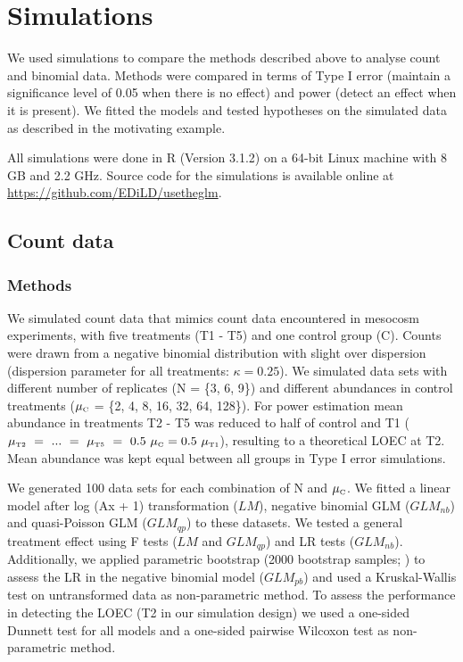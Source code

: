 \documentclass{scrartcl}
\begin{document}
\newpage
\section{Simulations}
We used simulations to compare the methods described above to analyse count and binomial data.
Methods were compared in terms of Type I error (maintain a significance level of 0.05 when there is no effect) and power (detect an effect when it is present). 
We fitted the models and tested hypotheses on the simulated data as described in the motivating example.

All simulations were done in R (Version 3.1.2) \citep{r_core_team_r:_2014} on a 64-bit Linux machine with 8 GB and 2.2 GHz.
Source code for the simulations is available online at \url{https://github.com/EDiLD/usetheglm}.

\subsection{Count data}
\subsubsection{Methods}
We simulated count data that mimics count data encountered in mesocosm experiments, with five treatments (T1 - T5) and one control group (C).
Counts were drawn from a negative binomial distribution with slight over dispersion (dispersion parameter for all treatments: $\kappa = 0.25$).
We simulated data sets with different number of replicates (N = \{3, 6, 9\}) and different abundances in control treatments ($\mu_\text{\tiny C}$ = \{2, 4, 8, 16, 32, 64, 128\}). 
For power estimation mean abundance in treatments T2 - T5 was reduced to half of control and T1 ($\mu_\text{\tiny T2}~=~...~=~\mu_\text{\tiny T5}~=~0.5~\mu_\text{\tiny C} = 0.5~\mu_\text{\tiny T1}$), resulting to a theoretical LOEC at T2.
Mean abundance was kept equal between all groups in Type I error simulations.

We generated 100 data sets for each combination of N and $\mu_\text{\tiny C}$. 
We fitted a linear model after log (Ax + 1) transformation ($LM$), negative binomial GLM ($GLM_{nb}$) and quasi-Poisson GLM ($GLM_{qp}$) to these datasets. 
We tested a general treatment effect using F tests ($LM$ and $GLM_{qp}$) and LR tests ($GLM_{nb}$). Additionally, we applied parametric bootstrap (2000 bootstrap samples; \citet{faraway_extending_2006}) to assess the LR in the negative binomial model ($GLM_{pb}$) and used a Kruskal-Wallis test on untransformed data as non-parametric method.
To assess the performance in detecting the LOEC (T2 in our simulation design) we used a one-sided Dunnett test for all models and a one-sided pairwise Wilcoxon test as non-parametric method.
 
\end{document}
